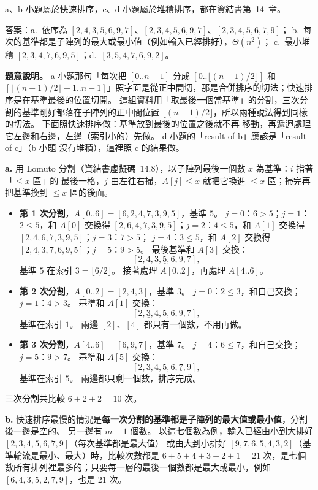 \begin{pastsoln}
a、b 小題屬於快速排序，c、d 小題屬於堆積排序，都在資結書第~14~章。

答案：a.\ 依序為 $[2, 4, 3, 5, 6, 9, 7]$、$[2, 3, 4, 5, 6, 9, 7]$、$[2, 3, 4, 5, 6, 7, 9]$；
b.\ 每次的基準都是子陣列的最大或最小值（例如輸入已經排好），$\Theta(n^2)$；
c.\ 最小堆積 $[2, 3, 4, 7, 6, 9, 5]$；d.\ $[3, 5, 4, 7, 6, 9, 2]$。

\textbf{題意說明。} a 小題那句「每次把 $[0..n-1]$ 分成 $[0..\lfloor (n-1)/2 \rfloor]$ 和
$[\lfloor (n-1)/2 \rfloor + 1..n-1]$」照字面是從正中間切，那是合併排序的切法；快速排序是在基準最後的位置切開。
這組資料用「取最後一個當基準」的分割，三次分割的基準剛好都落在子陣列的正中間位置
$\lfloor (n-1)/2 \rfloor$，所以兩種說法得到同樣的切法。 下面照快速排序做：基準放到最後的位置之後就不再
移動，再遞迴處理它左邊和右邊，左邊（索引小的）先做。 d 小題的「result of b」應該是「result of c」（b 小題
沒有堆積），這裡照 c 的結果做。

\textbf{a.} 用 Lomuto 分割（資結書虛擬碼~14.8），以子陣列最後一個數 $x$ 為基準：$i$ 指著「$\le x$ 區」的
最後一格，$j$ 由左往右掃，$A[j] \le x$ 就把它換進 $\le x$ 區；掃完再把基準換到 $\le x$ 區的後面。
\begin{itemize}
\item \textbf{第 1 次分割}，$A[0..6] = [6, 2, 4, 7, 3, 9, 5]$，基準 $5$。 $j = 0$：$6 > 5$；$j = 1$：$2 \le 5$，和
$A[0]$ 交換得 $[2, 6, 4, 7, 3, 9, 5]$；$j = 2$：$4 \le 5$，和 $A[1]$ 交換得 $[2, 4, 6, 7, 3, 9, 5]$；$j = 3$：$7 > 5$；
$j = 4$：$3 \le 5$，和 $A[2]$ 交換得 $[2, 4, 3, 7, 6, 9, 5]$；$j = 5$：$9 > 5$。 最後基準和 $A[3]$ 交換：
\[
[2, 4, 3, \underline{5}, 6, 9, 7],
\]
基準 $5$ 在索引 $3 = \lfloor 6/2 \rfloor$。 接著處理 $A[0..2]$，再處理 $A[4..6]$。
\item \textbf{第 2 次分割}，$A[0..2] = [2, 4, 3]$，基準 $3$。 $j = 0$：$2 \le 3$，和自己交換；$j = 1$：$4 > 3$。
基準和 $A[1]$ 交換：
\[
[2, \underline{3}, 4, 5, 6, 9, 7],
\]
基準在索引 $1$。 兩邊 $[2]$、$[4]$ 都只有一個數，不用再做。
\item \textbf{第 3 次分割}，$A[4..6] = [6, 9, 7]$，基準 $7$。 $j = 4$：$6 \le 7$，和自己交換；$j = 5$：$9 > 7$。
基準和 $A[5]$ 交換：
\[
[2, 3, 4, 5, 6, \underline{7}, 9],
\]
基準在索引 $5$。 兩邊都只剩一個數，排序完成。
\end{itemize}
三次分割共比較 $6 + 2 + 2 = 10$ 次。

\textbf{b.} 快速排序最慢的情況是\textbf{每一次分割的基準都是子陣列的最大值或最小值}，分割後一邊是空的、
另一邊有 $m - 1$ 個數。 以這七個數為例，輸入已經由小到大排好 $[2, 3, 4, 5, 6, 7, 9]$（每次基準都是最大值）
或由大到小排好 $[9, 7, 6, 5, 4, 3, 2]$（基準輪流是最小、最大）時，比較次數都是
$6 + 5 + 4 + 3 + 2 + 1 = 21$ 次，是七個數所有排列裡最多的；只要每一層的最後一個數都是最大或最小，例如
$[6, 4, 3, 5, 2, 7, 9]$，也是 $21$ 次。


\end{pastsoln}
